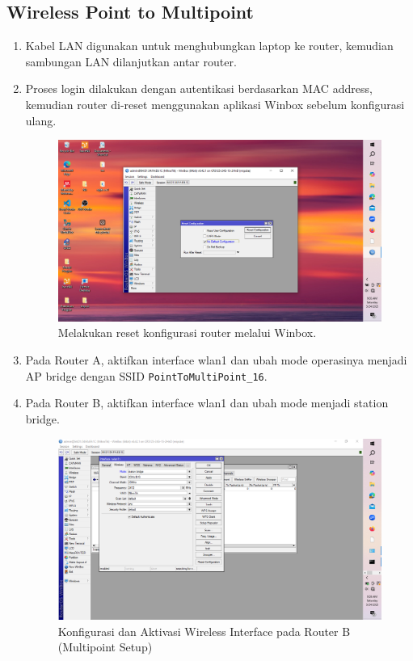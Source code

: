 \subsection{Wireless Point to Multipoint}
\begin{enumerate}
    \item Kabel LAN digunakan untuk menghubungkan laptop ke router, kemudian sambungan LAN dilanjutkan antar router.
    \item Proses login dilakukan dengan autentikasi berdasarkan MAC address, kemudian router di-reset menggunakan aplikasi Winbox sebelum konfigurasi ulang.
    \begin{figure}[H]
        \centering
        \includegraphics[width=0.5\linewidth]{P3/img/gambar1.png}
        \caption{Melakukan reset konfigurasi router melalui Winbox.}
        \label{fig:reset-router-multi}
    \end{figure}

    \item Pada Router A, aktifkan interface wlan1 dan ubah mode operasinya menjadi AP bridge dengan SSID \texttt{PointToMultiPoint\_16}.
 

    \item Pada Router B, aktifkan interface wlan1 dan ubah mode menjadi station bridge.
    \begin{figure}[H]
        \centering
        \includegraphics[width=0.5\linewidth]{P3/img/gambar3ma.png}
        \caption{Konfigurasi dan Aktivasi Wireless Interface pada Router B (Multipoint Setup)}
        \label{fig:aktif-wlan-b-multi}
    \end{figure}


\end{enumerate}
